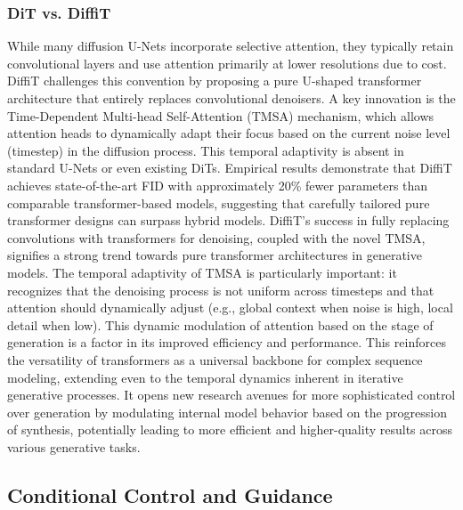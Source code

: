 \documentclass[a4paper]{article}
\begin{document}
\subsubsection*{DiT vs. DiffiT}
While many diffusion U-Nets incorporate selective attention, they typically retain convolutional layers and use attention primarily at lower resolutions due to cost. DiffiT \cite{Hatamizadeh2023DiffiT} challenges this convention by proposing a pure U-shaped transformer architecture that entirely replaces convolutional denoisers. A key innovation is the Time-Dependent Multi-head Self-Attention (TMSA) mechanism, which allows attention heads to dynamically adapt their focus based on the current noise level (timestep) in the diffusion process. This temporal adaptivity is absent in standard U-Nets or even existing DiTs. Empirical results demonstrate that DiffiT achieves state-of-the-art FID with approximately 20\% fewer parameters than comparable transformer-based models, suggesting that carefully tailored pure transformer designs can surpass hybrid models. DiffiT's success in fully replacing convolutions with transformers for denoising, coupled with the novel TMSA, signifies a strong trend towards pure transformer architectures in generative models. The temporal adaptivity of TMSA is particularly important: it recognizes that the denoising process is not uniform across timesteps and that attention should dynamically adjust (e.g., global context when noise is high, local detail when low). This dynamic modulation of attention based on the stage of generation is a factor in its improved efficiency and performance. This reinforces the versatility of transformers as a universal backbone for complex sequence modeling, extending even to the temporal dynamics inherent in iterative generative processes. It opens new research avenues for more sophisticated control over generation by modulating internal model behavior based on the progression of synthesis, potentially leading to more efficient and higher-quality results across various generative tasks.

\subsection{Conditional Control and Guidance}
\end{document}
